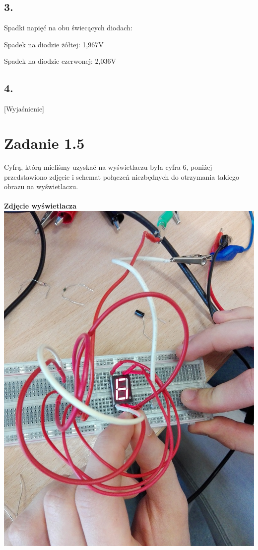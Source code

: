 \documentclass[polish,a4paper]{article}
\begin{document}


\subsection*{3.} Spadki napięć na obu świecących diodach:
\newline

Spadek na diodzie żółtej: 1,967V
\newline

Spadek na diodzie czerwonej: 2,036V
\newline


\subsection*{4.} [Wyjaśnienie]

\section{Zadanie 1.5}
Cyfrą, którą mieliśmy uzyskać na wyświetlaczu była cyfra 6, poniżej przedstawiono zdjęcie i schemat połączeń niezbędnych do otrzymania takiego obrazu na wyświetlaczu.\\
\\
\textbf{Zdjęcie wyświetlacza}\\
\includegraphics[width=\textwidth]{cyfra2}
\end{document}
